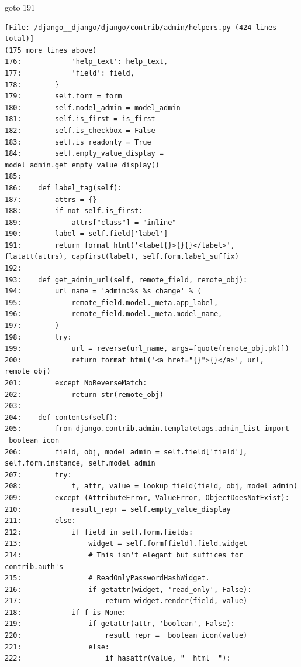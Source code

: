 {\begin{agentbox}
\hrulefill
\begin{CodeVerbatim}[breaklines=true, breakanywhere=true]
goto 191
\end{CodeVerbatim}
\end{agentbox}
\begin{observationbox}\begin{Verbatim}[breaklines=true, breakanywhere=true]
[File: /django__django/django/contrib/admin/helpers.py (424 lines total)]
(175 more lines above)
176:            'help_text': help_text,
177:            'field': field,
178:        }
179:        self.form = form
180:        self.model_admin = model_admin
181:        self.is_first = is_first
182:        self.is_checkbox = False
183:        self.is_readonly = True
184:        self.empty_value_display = model_admin.get_empty_value_display()
185:
186:    def label_tag(self):
187:        attrs = {}
188:        if not self.is_first:
189:            attrs["class"] = "inline"
190:        label = self.field['label']
191:        return format_html('<label{}>{}{}</label>', flatatt(attrs), capfirst(label), self.form.label_suffix)
192:
193:    def get_admin_url(self, remote_field, remote_obj):
194:        url_name = 'admin:%s_%s_change' % (
195:            remote_field.model._meta.app_label,
196:            remote_field.model._meta.model_name,
197:        )
198:        try:
199:            url = reverse(url_name, args=[quote(remote_obj.pk)])
200:            return format_html('<a href="{}">{}</a>', url, remote_obj)
201:        except NoReverseMatch:
202:            return str(remote_obj)
203:
204:    def contents(self):
205:        from django.contrib.admin.templatetags.admin_list import _boolean_icon
206:        field, obj, model_admin = self.field['field'], self.form.instance, self.model_admin
207:        try:
208:            f, attr, value = lookup_field(field, obj, model_admin)
209:        except (AttributeError, ValueError, ObjectDoesNotExist):
210:            result_repr = self.empty_value_display
211:        else:
212:            if field in self.form.fields:
213:                widget = self.form[field].field.widget
214:                # This isn't elegant but suffices for contrib.auth's
215:                # ReadOnlyPasswordHashWidget.
216:                if getattr(widget, 'read_only', False):
217:                    return widget.render(field, value)
218:            if f is None:
219:                if getattr(attr, 'boolean', False):
220:                    result_repr = _boolean_icon(value)
221:                else:
222:                    if hasattr(value, "__html__"):

\end{Verbatim}
\end{observationbox}}
